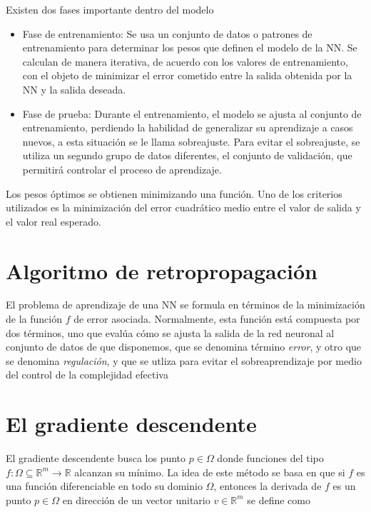 Existen dos fases importante dentro del modelo
\begin{itemize}
	\item Fase de entrenamiento: Se usa un conjunto de datos o patrones de entrenamiento para determinar los pesos que definen el modelo de la NN. Se calculan de manera iterativa, de acuerdo con los valores de entrenamiento, con el objeto de minimizar el error cometido entre la salida obtenida por la NN y la salida deseada.

	\item Fase de prueba: Durante el entrenamiento, el modelo se ajusta al conjunto de entrenamiento, perdiendo la habilidad de generalizar su aprendizaje a casos nuevos, a esta situación se le llama sobreajuste.
	Para evitar el sobreajuste, se utiliza un segundo grupo de datos diferentes, el conjunto de validación, que permitirá controlar el proceso de aprendizaje.
\end{itemize}
Los pesos óptimos se obtienen minimizando una función. Uno de los criterios utilizados es la minimización del error cuadrático medio entre el valor de salida y el valor real esperado.

\section{Algoritmo de retropropagación}
El problema de aprendizaje de una NN se formula en términos de la minimización de la función $f$ de error asociada. Normalmente, esta función está compuesta por dos términos, uno que evalúa cómo se ajusta la salida de la red neuronal al conjunto de datos de que disponemos, que se denomina término {\em error}, y otro que se denomina {\em regulación}, y que se utliza para evitar el sobreaprendizaje por medio del control de la complejidad efectiva

\section{El gradiente descendente}%
El gradiente descendente busca los punto $p \in \Omega$ donde funciones del tipo $f: \Omega\subseteq\mathbb{R}^m \rightarrow \mathbb{R}$ alcanzan su mínimo. La idea de este método se basa en que si $f$ es una función diferenciable en todo su dominio $\Omega$, entonces la derivada de $f$ es un punto $p \in \Omega$ en dirección de un vector unitario $v \in \mathbb{R}^m$ se define como

